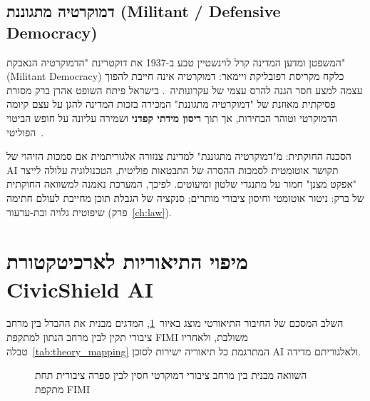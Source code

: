 \subsection{דמוקרטיה מתגוננת (Militant / Defensive Democracy)}
המשפטן ומדען המדינה קרל לוינשטיין טבע ב-1937 את דוקטרינת "הדמוקרטיה הנאבקת" (Militant Democracy) כלקח מקריסת רפובליקת ויימאר: דמוקרטיה אינה חייבת להפוך עצמה למצע חסר הגנה להרס עצמי של עקרונותיה~\cite{loewenstein1937militant}. בישראל פיתח השופט אהרן ברק מסורת פסיקתית מאוזנת של "דמוקרטיה מתגוננת" המכירה בזכות המדינה להגן על עצם קיומה הדמוקרטי וטוהר הבחירות, אך תוך \textbf{ריסון מידתי קפדני} ושמירה עליונה על חופש הביטוי הפוליטי~\cite{barak1988defensive}.

\begin{constitutionalbox}{הסכנה החוקתית: מ"דמוקרטיה מתגוננת" למדינת צנזורה אלגוריתמית}
אם סמכות הזיהוי של AI תקושר אוטומטית לסמכות ההסרה של התבטאות פוליטית, הטכנולוגיה עלולה לייצר "אפקט מצנן" חמור על מתנגדי שלטון ומיעוטים. לפיכך, המערכת נאמנה למשוואה החוקתית של ברק: ניטור אוטומטי וחיסון ציבורי מותרים; סנקציה של הגבלת תוכן מחייבת לעולם חתימה שיפוטית גלויה ובת-ערעור (פרק~\ref{ch:law}).
\end{constitutionalbox}

\section{מיפוי התיאוריות לארכיטקטורת CivicShield AI}
השלב המסכם של החיבור התיאורטי מוצג באיור~\ref{fig:public_sphere}, המדגים מבנית את ההבדל בין מרחב ציבורי תקין לבין מרחב הנתון למתקפת FIMI משולבת, ולאחריו טבלה~\ref{tab:theory_mapping} המתרגמת כל תיאוריה ישירות לסוכן AI ולאלגוריתם מדידה.

\begin{figure}[htbp]
    \centering
    
    \caption{השוואה מבנית בין מרחב ציבורי דמוקרטי חסין לבין ספרה ציבורית תחת מתקפת FIMI}
    \label{fig:public_sphere}
\end{figure}

